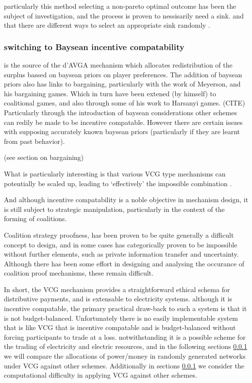 particularly this method selecting a non-pareto optimal outcome has been the subject of investigation, and the process is proven to nessisarily need a sink.
and that there are different ways to select an appropriate sink randomly \cite{NATH2019673}.



\subsubsection{switching to Baysean incentive compatability}

is the source of the d'AVGA mechanism which allocates redistribution of the surplus bassed on baysean priors on player preferences.
The addition of baysean priors also has links to bargaining, particularly with the work of Meyerson, and his bargaining games.
Which in turn have been extened (by himself) to coalitional games, and also through some of his work to Harsanyi games. (CITE)
Particularly through the introduction of baysean considerations other schemes can redily be made to be incentive compatable.
However there are certain issues with supposing accurately known baysean priors (particularly if they are learnt from past behavior).

 (see section on bargaining)







What is particularly interesting is that various VCG type mechanisms can potentially be scaled up, leading to `effectively' the impossible combination \cite{NATH2019673, 8430852}.

And although incentive compatability is a noble objective in mechanism design, it is still subject to strategic manipulation, particularly in the context of the forming of coalitions.

Coalition strategy proofness, has been proven to be quite generally a difficult concept to design, and in some cases has categorically proven to be impossible \cite{10.2307/2297048} without further elements, such as private information transfer and uncertainty.
Although there has been some effort in designing and analysing the occurance of coalition proof mechanisms, these remain difficult.


In short, the VCG mechanism provides a straightforward ethical schema for distributive payments, and is extensable to electricity systems.
although it is incentive compatable, the primary practical draw-back to such a system is that it is not budget-balanced.
Unfortunately there is no easily implementable system that is like VCG that is incentive compatable and is budget-balanced without forcing participants to trade at a loss.
notwithstanding it is a possible scheme for the trading of electricity and electric resources, and in the following sections \ref{} we will compare the allocations of power/money in randomly generated networks under VCG against other schemes.
Additionally in sections \ref{} we consider the computational difficulty in applying VCG against other schemes.



